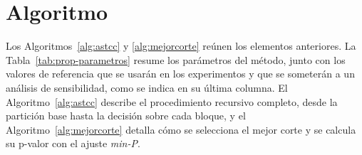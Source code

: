 \section{Algoritmo}\label{sec:prop-algoritmo}

Los Algoritmos~\ref{alg:astcc} y \ref{alg:mejorcorte} reúnen los elementos
anteriores. La Tabla~\ref{tab:prop-parametros} resume los parámetros del método,
junto con los valores de referencia que se usarán en los experimentos y que se
someterán a un análisis de sensibilidad, como se indica en su última columna. El
Algoritmo~\ref{alg:astcc} describe el procedimiento recursivo completo, desde la
partición base hasta la decisión sobre cada bloque, y el
Algoritmo~\ref{alg:mejorcorte} detalla cómo se selecciona el mejor corte y se
calcula su p-valor con el ajuste \emph{min-P}.

